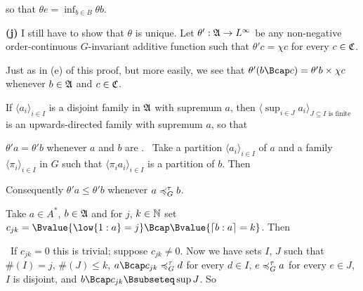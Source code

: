 {

\noindent so that $\theta e=\inf_{b\in B}\theta b$.\ \Qed

\medskip

{\bf (j)} I still have to show that $\theta$ is unique.   Let
$\theta':\frak A\to L^{\infty}$ be any non-negative order-continuous
$G$-invariant additive function such that $\theta'c=\chi c$ for every
$c\in\frak C$.

\medskip

 Just as in (e) of this proof, but more easily, we
see that $\theta'(b\Bcap c)=\theta'b\times\chi c$ whenever
$b\in\frak A$ and $c\in\frak C$.

\medskip

 If $\langle a_i\rangle_{i\in I}$ is a disjoint family in
$\frak A$ with supremum $a$, then
$\langle\sup_{i\in J}a_i\rangle_{J\subseteq I\text{ is finite}}$ is an
upwards-directed family with supremum $a$, so that


\medskip

 $\theta'a=\theta'b$ whenever $a$ and $b$ are \Gte.
\Prf\ Take a partition $\langle a_i\rangle_{i\in I}$ of $a$ and a family
$\langle\pi_i\rangle_{i\in I}$ in $G$ such that
$\langle\pi_ia_i\rangle_{i\in I}$ is a partition of $b$.   Then


\noindent Consequently $\theta'a\le\theta'b$ whenever $a\preccurlyeq^{\tau}_G b$.

\medskip

 Take $a\in A^*$, $b\in\frak A$ and for $j$, $k\in\Bbb N$
set $c_{jk}=\Bvalue{\low{1:a}=j}\Bcap\Bvalue{\high{b:a}=k}$.  Then


\noindent\Prf\ If $c_{jk}=0$ this is trivial;  suppose $c_{jk}\ne 0$.
Now we have sets $I$, $J$ such that $\#(I)=j$, $\#(J)\le k$, $a\Bcap
c_{jk}\ptG d$ for every $d\in I$, $e\preccurlyeq^{\tau}_G a$ for every $e\in J$, $I$ is
disjoint, and $b\Bcap c_{jk}\Bsubseteq\sup J$.   So

}
